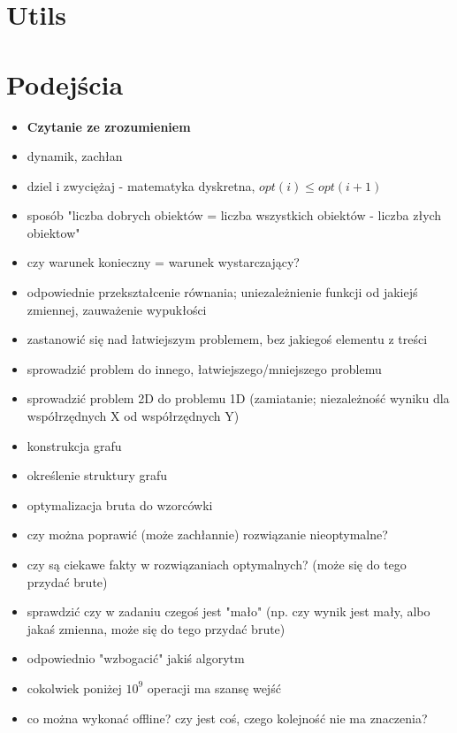 \chapter{Utils}


\chapter{Podejścia}

\begin{itemize}[noitemsep]
	\item \textbf{Czytanie ze zrozumieniem}
	\item dynamik, zachłan
	\item dziel i zwyciężaj - matematyka dyskretna, $opt(i) \leq opt(i + 1)$
	\item sposób "liczba dobrych obiektów = liczba wszystkich obiektów - liczba złych obiektow"
	\item czy warunek konieczny = warunek wystarczający?
	\item odpowiednie przekształcenie równania; uniezależnienie funkcji od jakiejś zmiennej, zauważenie wypukłości
	\item zastanowić się nad łatwiejszym problemem, bez jakiegoś elementu z treści
	\item sprowadzić problem do innego, łatwiejszego/mniejszego problemu
	\item sprowadzić problem 2D do problemu 1D (zamiatanie; niezależność wyniku dla współrzędnych X od współrzędnych Y)
	\item konstrukcja grafu
	\item określenie struktury grafu
	\item optymalizacja bruta do wzorcówki
	\item czy można poprawić (może zachłannie) rozwiązanie nieoptymalne?
	\item czy są ciekawe fakty w rozwiązaniach optymalnych? (może się do tego przydać brute)
	\item sprawdzić czy w zadaniu czegoś jest "mało" (np. czy wynik jest mały, albo jakaś zmienna, może się do tego przydać brute)
	\item odpowiednio "wzbogacić" jakiś algorytm
	\item cokolwiek poniżej $10^9$ operacji ma szansę wejść
	\item co można wykonać offline? czy jest coś, czego kolejność nie ma znaczenia?

\end{itemize}

